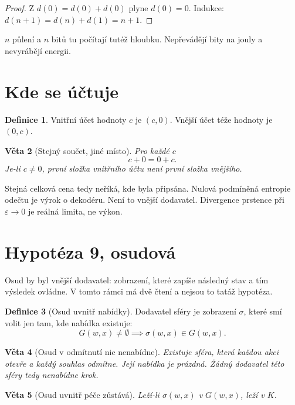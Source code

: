 \documentclass[11pt,a4paper]{article}
\newtheorem{theorem}{Věta}
\theoremstyle{definition}
\newtheorem{definition}[theorem]{Definice}
\theoremstyle{remark}
\begin{document}
\begin{proof}
Z \(d(0)=d(0)+d(0)\) plyne \(d(0)=0\).
Indukce: \(d(n+1)=d(n)+d(1)=n+1\).
\end{proof}

\(n\) půlení a \(n\) bitů tu počítají tutéž hloubku.
Nepřevádějí bity na jouly a nevyrábějí energii.

\section{Kde se účtuje}

\begin{definition}
Vnitřní účet hodnoty \(c\) je \((c,0)\).
Vnější účet téže hodnoty je \((0,c)\).
\end{definition}

\begin{theorem}[Stejný součet, jiné místo]
Pro každé \(c\)
\[
  c+0=0+c.
\]
Je-li \(c\neq 0\), první složka vnitřního účtu není první složka vnějšího.
\end{theorem}

Stejná celková cena tedy neříká, kde byla připsána.
Nulová podmíněná entropie odečtu je výrok o dekodéru.
Není to vnější dodavatel.
Divergence prstence při \(\varepsilon\to 0\) je reálná limita, ne výkon.

\section{Hypotéza 9, osudová}

Osud by byl vnější dodavatel: zobrazení, které zapíše následný stav a tím výsledek ovládne.
V tomto rámci má dvě čtení a nejsou to tatáž hypotéza.

\begin{definition}[Osud uvnitř nabídky]
Dodavatel sféry je zobrazení \(\sigma\), které smí volit jen tam, kde nabídka existuje:
\[
  G(w,x)\neq\emptyset\implies \sigma(w,x)\in G(w,x).
\]
\end{definition}

\begin{theorem}[Osud v odmítnutí nic nenabídne]
Existuje sféra, která každou akci otevře a každý souhlas odmítne.
Její nabídka je prázdná. Žádný dodavatel této sféry tedy nenabídne krok.
\end{theorem}

\begin{theorem}[Osud uvnitř péče zůstává]
Leží-li \(\sigma(w,x)\) v \(G(w,x)\), leží v \(K\).
\end{theorem}
\end{document}
